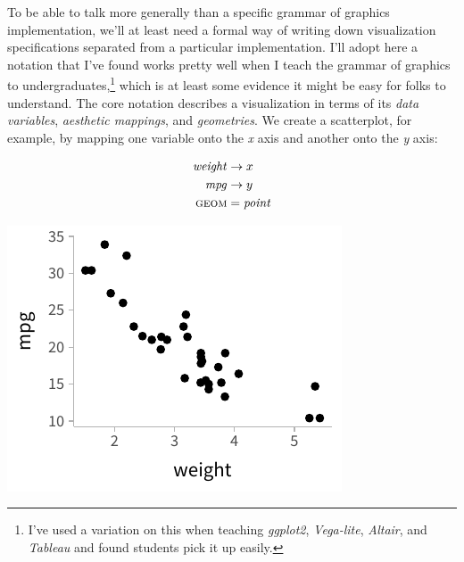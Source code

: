 \documentclass[journal]{vgtc}                     %
\begin{document}
To be able to talk more generally than a specific grammar of graphics implementation, we'll at least need a formal way of writing down visualization specifications separated from a particular implementation. I'll adopt here a notation that I've found works pretty well when I teach the grammar of graphics to undergraduates,\footnote{I've used a variation on this when teaching \textit{ggplot2}, \textit{Vega-lite}, \textit{Altair}, and \textit{Tableau} and found students pick it up easily.} which is at least some evidence it might be easy for folks to understand. The core notation describes a visualization in terms of its \textit{data variables}, \textit{aesthetic mappings}, and \textit{geometries}. We create a scatterplot, for example, by mapping one variable onto the \textit{x} axis and another onto the \textit{y} axis:

\hfill\break
  \begin{minipage}{.5\columnwidth}
    \begin{align*}
\mathit{weight} &\rightarrow x\\
\mathit{mpg} &\rightarrow y\\
\textsc{geom} &= \mathit{point}
\end{align*}
  \end{minipage}%
  \begin{minipage}{.4\columnwidth}
    \centering
    \includegraphics[width=1.2\columnwidth]{figs/2-mpg_v_weight.pdf}
  \end{minipage}
\end{document}
